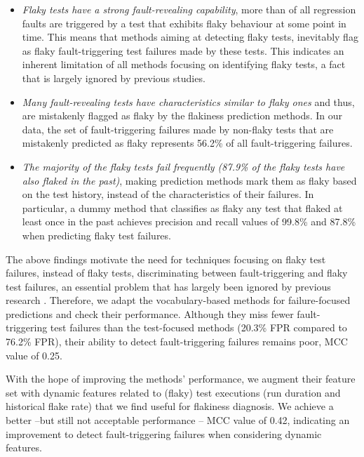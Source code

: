 \begin{itemize}
    \item \textit{Flaky tests have a strong fault-revealing capability}, \ie more than  of all regression faults are triggered by a test that exhibits flaky behaviour at some point in time. This means that methods aiming at detecting flaky tests, inevitably flag as flaky fault-triggering test failures made by these tests. This indicates an inherent limitation of all methods focusing on identifying flaky tests, a fact that is largely ignored by previous studies.
    
    \item \textit{Many fault-revealing tests have characteristics similar to flaky ones} and thus, are mistakenly flagged as flaky by the flakiness prediction methods.
    In our data, the set of fault-triggering failures made by non-flaky tests that are mistakenly predicted as flaky represents 56.2\% of all fault-triggering failures. 

    \item \textit{The majority of the flaky tests fail frequently (87.9\% of the flaky tests have also flaked in the past)}, making prediction methods mark them as flaky based on the test history, instead of the characteristics of their failures. In particular, a dummy method that classifies as flaky any test that flaked at least once in the past achieves precision and recall values of 99.8\% and 87.8\% when predicting flaky test failures.
\end{itemize}

The above findings motivate the need for techniques focusing on flaky test failures, instead of flaky tests, \ie discriminating between fault-triggering and flaky test failures, an essential problem that has largely been ignored by previous research \cite{Parry2021}. Therefore, we adapt the vocabulary-based methods for failure-focused predictions and check their performance. Although they miss fewer fault-triggering test failures than the test-focused methods (20.3\% FPR compared to 76.2\% FPR), their ability to detect fault-triggering failures remains poor, MCC value of 0.25. 

With the hope of improving the methods' performance, we augment their feature set with dynamic features related to (flaky) test executions (\eg run duration and historical flake rate) that we find useful for flakiness diagnosis. We achieve a better --but still not acceptable performance -- MCC value of 0.42, indicating an improvement to detect fault-triggering failures when considering dynamic features. 


